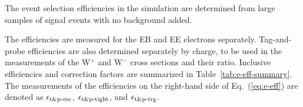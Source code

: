 
The \TNP event selection efficiencies in the simulation 
are determined from large samples of signal events with no
background added.


The \TNP efficiencies are measured for the EB and EE electrons separately.
Tag-and-probe efficiencies are also determined separately by charge, 
to be used in the measurements of the W$^+$ and W$^-$ cross sections and their ratio.
Inclusive efficiencies and correction factors are summarized in 
Table~\ref{tab:e-eff-summary}. The \TNP measurements of the efficiencies 
on the right-hand side of Eq.~(\ref{eq:e-eff})
are denoted as $  \epsilon_{\textrm{t\&p-rec}}    $, $ \epsilon_{\textrm{t\&p-tight}}  $, and $  \epsilon_{\textrm{t\&p-trg}}    $.

